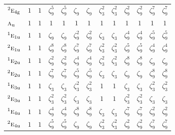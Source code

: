 \documentclass[10pt,a4paper]{article}
\numberwithin{equation}{section}
\newcommand{\irr}[1]{\text{\normalfont\scshape #1}}
\newcommand{\conjpair}[1]{{}^{#1}}
\newcommand{\ptag}[1]{\mathrm{#1}}
\newcommand{\rootunity}[1]{\zeta_{#1}}
\begin{document}
{\begin{longtable}{@{}lcccccccccccc@{}}
$\conjpair{2}\irr{e}_{4\ptag{g}}$ & $1$ & $1$ & $\rootunity{9}^{5}$ & $\rootunity{9}^{5}$ & $\rootunity{9}$ & $\rootunity{9}$ & $\rootunity{3}^{2}$ & $\rootunity{3}^{2}$ & $\rootunity{9}^{2}$ & $\rootunity{9}^{2}$ & $\rootunity{9}^{7}$ & $\rootunity{9}^{7}$\\
$\irr{a}_{\ptag{u}}$ & $1$ & $1$ & $1$ & $1$ & $1$ & $1$ & $1$ & $1$ & $1$ & $1$ & $1$ & $1$\\
$\conjpair{1}\irr{e}_{1\ptag{u}}$ & $1$ & $1$ & $\rootunity{9}$ & $\rootunity{9}$ & $\rootunity{9}^{2}$ & $\rootunity{9}^{2}$ & $\rootunity{3}$ & $\rootunity{3}$ & $\rootunity{9}^{4}$ & $\rootunity{9}^{4}$ & $\rootunity{9}^{5}$ & $\rootunity{9}^{5}$\\
$\conjpair{2}\irr{e}_{1\ptag{u}}$ & $1$ & $1$ & $\rootunity{9}^{8}$ & $\rootunity{9}^{8}$ & $\rootunity{9}^{7}$ & $\rootunity{9}^{7}$ & $\rootunity{3}^{2}$ & $\rootunity{3}^{2}$ & $\rootunity{9}^{5}$ & $\rootunity{9}^{5}$ & $\rootunity{9}^{4}$ & $\rootunity{9}^{4}$\\
$\conjpair{1}\irr{e}_{2\ptag{u}}$ & $1$ & $1$ & $\rootunity{9}^{2}$ & $\rootunity{9}^{2}$ & $\rootunity{9}^{4}$ & $\rootunity{9}^{4}$ & $\rootunity{3}^{2}$ & $\rootunity{3}^{2}$ & $\rootunity{9}^{8}$ & $\rootunity{9}^{8}$ & $\rootunity{9}$ & $\rootunity{9}$\\
$\conjpair{2}\irr{e}_{2\ptag{u}}$ & $1$ & $1$ & $\rootunity{9}^{7}$ & $\rootunity{9}^{7}$ & $\rootunity{9}^{5}$ & $\rootunity{9}^{5}$ & $\rootunity{3}$ & $\rootunity{3}$ & $\rootunity{9}$ & $\rootunity{9}$ & $\rootunity{9}^{8}$ & $\rootunity{9}^{8}$\\
$\conjpair{1}\irr{e}_{3\ptag{u}}$ & $1$ & $1$ & $\rootunity{3}$ & $\rootunity{3}$ & $\rootunity{3}^{2}$ & $\rootunity{3}^{2}$ & $1$ & $1$ & $\rootunity{3}$ & $\rootunity{3}$ & $\rootunity{3}^{2}$ & $\rootunity{3}^{2}$\\
$\conjpair{2}\irr{e}_{3\ptag{u}}$ & $1$ & $1$ & $\rootunity{3}^{2}$ & $\rootunity{3}^{2}$ & $\rootunity{3}$ & $\rootunity{3}$ & $1$ & $1$ & $\rootunity{3}^{2}$ & $\rootunity{3}^{2}$ & $\rootunity{3}$ & $\rootunity{3}$\\
$\conjpair{1}\irr{e}_{4\ptag{u}}$ & $1$ & $1$ & $\rootunity{9}^{4}$ & $\rootunity{9}^{4}$ & $\rootunity{9}^{8}$ & $\rootunity{9}^{8}$ & $\rootunity{3}$ & $\rootunity{3}$ & $\rootunity{9}^{7}$ & $\rootunity{9}^{7}$ & $\rootunity{9}^{2}$ & $\rootunity{9}^{2}$\\
$\conjpair{2}\irr{e}_{4\ptag{u}}$ & $1$ & $1$ & $\rootunity{9}^{5}$ & $\rootunity{9}^{5}$ & $\rootunity{9}$ & $\rootunity{9}$ & $\rootunity{3}^{2}$ & $\rootunity{3}^{2}$ & $\rootunity{9}^{2}$ & $\rootunity{9}^{2}$ & $\rootunity{9}^{7}$ & $\rootunity{9}^{7}$\\

\end{longtable}}
\end{document}

